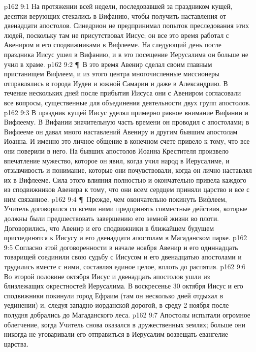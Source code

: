 \vs p162 9:1 На протяжении всей недели, последовавшей за праздником кущей, десятки верующих стекались в Вифанию, чтобы получить наставления от двенадцати апостолов. Синедрион не предпринимал попыток преследования этих людей, поскольку там не присутствовал Иисус; он все это время работал с Авениром и его сподвижниками в Вифлееме. На следующий день после праздника Иисус ушел в Вифанию, и в это посещение Иерусалима он больше не учил в храме.
\vs p162 9:2 \P\ В это время Авенир сделал своим главным пристанищем Вифлеем, и из этого центра многочисленные миссионеры отправлялись в города Иудеи и южной Самарии и даже в Александрию. В течение нескольких дней после прибытия Иисуса они с Авениром согласовали все вопросы, существенные для объединения деятельности двух групп апостолов.
\vs p162 9:3 В праздник кущей Иисус уделял примерно равное внимание Вифании и Вифлеему. В Вифании значительную часть времени он проводил с апостолами; в Вифлееме он давал много наставлений Авениру и другим бывшим апостолам Иоанна. И именно это личное общение в конечном счете привело к тому, что все они поверили в него. На бывших апостолов Иоанна Крестителя произвело впечатление мужество, которое он явил, когда учил народ в Иерусалиме, и отзывчивость и понимание, которые они почувствовали, когда он лично наставлял их в Вифлееме. Сила этого влияния полностью и окончательно привела каждого из сподвижников Авенира к тому, что они всем сердцем приняли царство и все с ним связанное.
\vs p162 9:4 \P\ Прежде, чем окончательно покинуть Вифлеем, Учитель договорился со всеми ними предпринять совместные действия, которые должны были предшествовать завершению его земной жизни во плоти. Договорились, что Авенир и его сподвижники в ближайшем будущем присоединятся к Иисусу и его двенадцати апостолам в Магаданском парке.
\vs p162 9:5 Согласно этой договоренности в начале ноября Авенир и его одиннадцать товарищей соединили свою судьбу с Иисусом и его двенадцатью апостолами и трудились вместе с ними, составляя единое целое, вплоть до распятия.
\vs p162 9:6 Во второй половине октября Иисус и двенадцать апостолов ушли из близлежащих окрестностей Иерусалима. В воскресенье 30 октября Иисус и его сподвижники покинули город Ефраим (там он несколько дней отдыхал в уединении) и, следуя западно\hyp{}иорданской дорогой, в среду 2 ноября после полудня добрались до Магаданского леса.
\vs p162 9:7 Апостолы испытали огромное облегчение, когда Учитель снова оказался в дружественных землях; больше они никогда не уговаривали его отправиться в Иерусалим возвещать евангелие царства.
